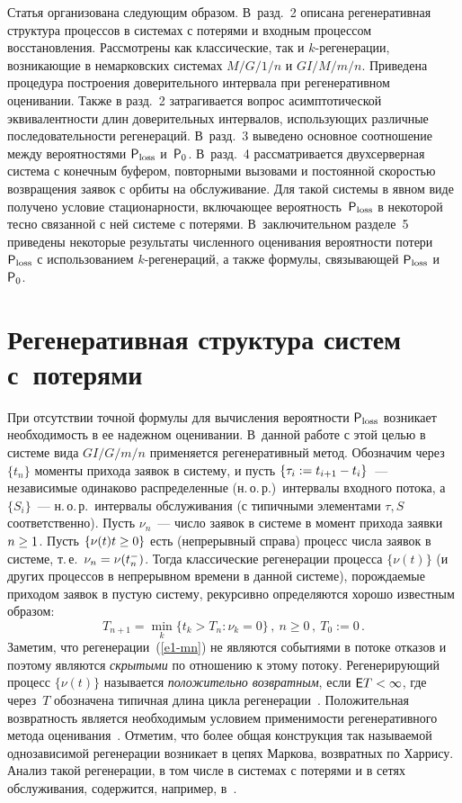 \begin{multicols}{2}
Статья организована следующим образом. В~разд.~2  описана регенеративная
структура процессов в сис\-те\-мах с потерями и входным процессом восстановления.
Рассмотрены как классические, так и $k$-ре\-ге\-не\-ра\-ции, возникающие в немарковских
сис\-те\-мах $M/G/1/n$ и  $GI/M/m/n$. Приведена процедура построения
доверительного интервала при регенеративном оценивании. Также в разд.~2
затрагивается вопрос асимптотической эквивалентности длин доверительных
интервалов, использующих различные последовательности  регенераций. В~разд.~3
 выведено основное соотношение между  вероятностями   ${\sf P}_{\mathrm{loss}}$ и~${\sf P}_0$.
 В~разд.~4 рассматривается двухсерверная система с конечным буфером,
 повторными вызовами и постоянной скоростью возвращения заявок с орбиты на обслуживание.
Для такой системы в явном виде получено условие стационарности, включающее
вероятность~${\sf P}_{\mathrm{loss}}$ в некоторой тесно связанной с ней системе с потерями. 
В~заключительном разделе~5 приведены некоторые результаты численного оценивания
ве\-ро\-ят\-ности потери ${\sf P}_{\mathrm{loss}}$ с использованием $k$-ре\-ге\-не\-ра\-ций, а также
формулы, связывающей ${\sf P}_{\mathrm{loss}}$ и~${\sf P}_0$.

\section{Регенеративная структура систем с~потерями}

При отсутствии точной формулы для вычисления вероятности ${\sf P}_{\mathrm{loss}}$
возникает необходимость в ее надежном  оценивании. В~данной работе с
этой целью  в сис\-те\-ме вида $GI/G/m/n$ применяется регенеративный
метод. Обозначим через $\{t_n\}$ моменты прихода заявок в сис\-те\-му, и
пусть $\{\tau_i:=t_{i+1}\hm-t_i\}$~--- независимые одинаково
распределенные (н.\,о.\,р.)\ интервалы входного потока, а $\{S_i\}$~---
н.\,о.\,р.\ интервалы обслуживания (с типичными элементами $\tau,S$
соответственно). Пусть $\nu_n$~--- число заявок в сис\-те\-ме в момент
прихода заявки $n\hm\ge 1$. Пусть $\{\nu(t)t\hm\ge 0\}$ есть
(непрерывный справа) процесс числа заявок в сис\-те\-ме, т.\,е.\
$\nu_n\hm=\nu(t_n^-)$. Тогда классические регенерации процесса $\{\nu(t)\}$ 
(и других процессов в непрерывном времени в данной сис\-те\-ме),
по\-рож\-да\-емые приходом заявок в пустую сис\-те\-му, рекурсивно
определяются хорошо известным образом: 
\begin{equation}
T_{n+1}=\min\limits_k\{t_k>T_n: \nu_k=0\}\,, \ n \ge 0\,,\ T_0:=0\,.
\label{e1-mn} 
\end{equation} 
Заметим, что регенерации~(\ref{e1-mn}) не являются событиями в потоке отказов и 
поэтому являются \emph{скрытыми} по отношению к этому потоку. Регенерирующий процесс
$\{\nu(t)\}$ называется {\it положительно возвратным}, если $\e T\hm<\infty$, где через~$T$ 
обозначена типичная длина цикла регенерации~\cite{Wolff, Morozov2004}.
 Положительная возвратность является необходимым условием
применимости регенеративного метода оценивания~\cite{Asmus}. Отметим, что более
общая конструкция так называемой однозависимой регенерации возникает в цепях
Маркова, возвратных по Харрису. Анализ такой регенерации, в том числе в
сис\-те\-мах с потерями и в  сетях обслуживания, содержится, например, в~\cite{Sig2, Sig3}.


\end{multicols}
